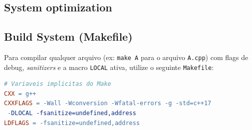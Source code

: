 \subsection{System optimization}

\subsection{Build System (Makefile)}

Para compilar qualquer arquivo (ex: \texttt{make A} para o arquivo \texttt{A.cpp}) com flags de debug, \textit{sanitizers} e a macro \texttt{LOCAL} ativa, utilize o seguinte \texttt{Makefile}:

\begin{lstlisting}[language=make]
# Variaveis implicitas do Make
CXX = g++
CXXFLAGS = -Wall -Wconversion -Wfatal-errors -g -std=c++17 
 -DLOCAL -fsanitize=undefined,address
LDFLAGS = -fsanitize=undefined,address

\end{lstlisting}

